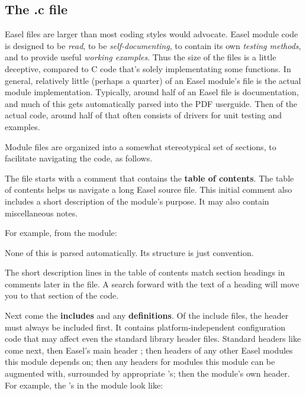 \subsection{The .c file}

Easel  files are larger than most coding styles would
advocate. Easel module code is designed to be \emph{read}, to be
\emph{self-documenting}, to contain its own \emph{testing methods},
and to provide useful \emph{working examples}.  Thus the size of the
files is a little deceptive, compared to C code that's solely
implementating some functions. In general, relatively little (perhaps
a quarter) of an Easel module's  file is the actual module
implementation.  Typically, around half of an Easel  file is
documentation, and much of this gets automatically parsed into the PDF
userguide. Then of the actual code, around half of that often consists
of drivers for unit testing and examples.

Module files are organized into a somewhat stereotypical set of
sections, to facilitate navigating the code, as follows.

The  file starts with a comment that contains the {\bfseries
  table of contents}. The table of contents helps us navigate a long
Easel source file. This initial comment also includes a short
description of the module's purpose. It may also contain miscellaneous
notes.

For example, from the  module:



None of this is parsed automatically. Its structure is just
convention.

The short description lines in the table of contents match section
headings in comments later in the file. A search forward with the text
of a heading will move you to that section of the code.

Next come the {\bfseries includes} and any {\bf definitions}. Of the
include files, the  header must always be
included first. It contains platform-independent configuration code
that may affect even the standard library header files. Standard
headers like  come next, then Easel's main header
; then headers of any other Easel modules this module
depends on; then any headers for modules this module can be augmented
with, surrounded by appropriate 's; then the module's
own header. For example, the 's in the
 module look like:

